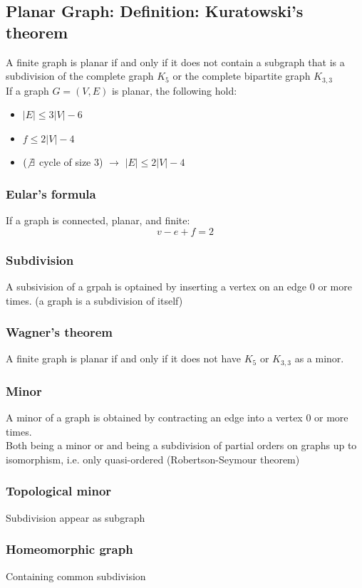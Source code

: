 \documentclass[10pt]{article}
\theoremstyle{definition}
\begin{document}
\subsection{Planar Graph: Definition: Kuratowski's theorem}
A finite graph is planar if and only if it does not contain a subgraph that is a subdivision of the complete graph $K_5$ or the complete bipartite graph $K_{3, 3}$\\
If a graph $G = (V, E)$ is planar, the following hold:
\begin{itemize}
  \item $|E| \leq 3|V| - 6$
  \item $f \leq 2 |V| - 4$
  \item $(\not\exists$ cycle of size 3) $\rightarrow$ $|E| \leq 2|V| -4 $
\end{itemize}
\subsubsection*{Eular's formula}
If a graph is connected, planar, and finite:
\[v - e + f = 2\]
\subsubsection*{Subdivision}
A subsivision of a grpah is optained by inserting a vertex on an edge 0 or more times. (a graph is a subdivision of itself)
\subsubsection*{Wagner's theorem}
A finite graph is planar if and only if it does not have $K_5$ or $K_{3,3}$ as a minor.
\subsubsection*{Minor}
A minor of a graph is obtained by contracting an edge into a vertex 0 or more times.\\
Both being a minor or and being a subdivision of partial orders on graphs up to isomorphism, i.e. only quasi-ordered (Robertson-Seymour theorem)
\subsubsection*{Topological minor}
Subdivision appear as subgraph
\subsubsection*{Homeomorphic graph}
Containing common subdivision
\end{document}
